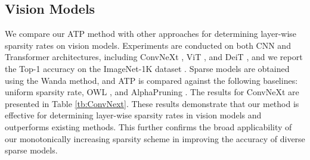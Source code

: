 \subsection{Vision Models}\label{sec:vision_models}
We compare our ATP method with other approaches for determining layer-wise sparsity rates on vision models. Experiments are conducted on both CNN and Transformer architectures, including ConvNeXt \citep{Liu_2022_CVPR}, ViT \citep{dosovitskiy2021an}, and DeiT \citep{touvron2021training}, and we report the Top-1 accuracy on the ImageNet-1K dataset \citep{deng2009imagenet}. Sparse models are obtained using the Wanda \citep{sun2023simple} method, and ATP is compared against the following baselines: uniform sparsity rate, OWL \citep{yin2023outlier}, and AlphaPruning \citep{lu2024alphapruning}. The results for ConvNeXt are presented in Table \ref{tb:ConvNext}. These results demonstrate that our method is effective for determining layer-wise sparsity rates in vision models and outperforms existing methods. This further confirms the broad applicability of our monotonically increasing sparsity scheme in improving the accuracy of diverse sparse models.
\begin{table}[h!]
    \centering
    \caption{Comparison of ImageNet-1K accuracy across different layer-wise sparsity methods on the ConvNeXt-Base model.}\label{tb:ConvNext}
\end{table}

